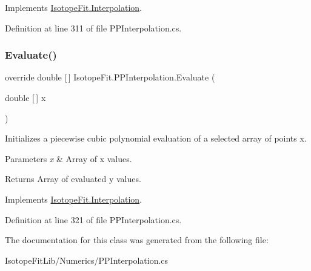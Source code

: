 Implements \hyperlink{class_isotope_fit_1_1_interpolation}{Isotope\+Fit.\+Interpolation}.



Definition at line 311 of file P\+P\+Interpolation.\+cs.

\mbox{\label{class_isotope_fit_1_1_p_p_interpolation_a5a4a1dbfcaa78e520dfc965e64ed227c}} 
\subsubsection{\texorpdfstring{Evaluate()}{Evaluate()}\hspace{0.1cm}{\footnotesize\ttfamily [2/2]}}
{\footnotesize\ttfamily override double \mbox{[}$\,$\mbox{]} Isotope\+Fit.\+P\+P\+Interpolation.\+Evaluate (\begin{DoxyParamCaption}\item[{double \mbox{[}$\,$\mbox{]}}]{x }\end{DoxyParamCaption})\hspace{0.3cm}{\ttfamily [virtual]}}



Initializes a piecewise cubic polynomial evaluation of a selected array of points x. 


\begin{DoxyParams}{Parameters}
{\em x} & Array of x values.\\
\hline
\end{DoxyParams}
\begin{DoxyReturn}{Returns}
Array of evaluated y values.
\end{DoxyReturn}


Implements \hyperlink{class_isotope_fit_1_1_interpolation}{Isotope\+Fit.\+Interpolation}.



Definition at line 321 of file P\+P\+Interpolation.\+cs.



The documentation for this class was generated from the following file\+:\begin{DoxyCompactItemize}
\item 
Isotope\+Fit\+Lib/\+Numerics/P\+P\+Interpolation.\+cs\end{DoxyCompactItemize}
